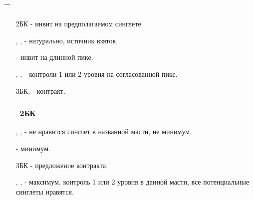 \documentclass{article}
\begin{document}
\subsection{ -- }
\begin{enumerate} 
    \item[2БК] - инвит на предполагаемом синглете.
    \item[\cl{3}, \di{3}, \he{3}] - натурально, источник взяток.
    \item[\sp{3}] - инвит на длинной пике.
    \item[\cl{4}, \di{4}, \he{4}] - контроли 1 или 2 уровня на согласованной пике.
    \item[3БК, \sp{4}] - контракт.
\end{enumerate}
\subsubsection{ --  -- 2БК}
\begin{enumerate}
    \item[\cl{3}, \di{3}, \he{3}] -  не нравится синглет в названной масти, не минимум.
    \item[\sp{3}] - минимум.
    \item[3БК] - предложение контракта.
    \item[\cl{4}, \di{4}, \he{4}] - максимум, контроль 1 или 2 уровня в данной масти, все потенциальные синглеты нравятся.
\end{enumerate}
\end{document}
